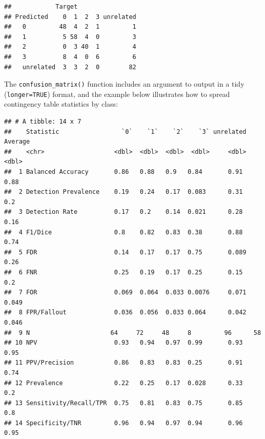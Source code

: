 \documentclass[9pt,a4paper,]{extarticle}
\newenvironment{Shaded}{\begin{snugshade}}{\end{snugshade}}
\newcommand{\DataTypeTok}[1]{\textcolor[rgb]{0.13,0.29,0.53}{#1}}
\newcommand{\DecValTok}[1]{\textcolor[rgb]{0.00,0.00,0.81}{#1}}
\newcommand{\KeywordTok}[1]{\textcolor[rgb]{0.13,0.29,0.53}{\textbf{#1}}}
\newcommand{\NormalTok}[1]{#1}
\newcommand{\OperatorTok}[1]{\textcolor[rgb]{0.81,0.36,0.00}{\textbf{#1}}}
\newcommand{\OtherTok}[1]{\textcolor[rgb]{0.56,0.35,0.01}{#1}}
\newcommand{\StringTok}[1]{\textcolor[rgb]{0.31,0.60,0.02}{#1}}
\begin{document}
\begin{verbatim}
##            Target
## Predicted    0  1  2  3 unrelated
##   0         48  4  2  1         1
##   1          5 58  4  0         3
##   2          0  3 40  1         4
##   3          8  4  0  6         6
##   unrelated  3  3  2  0        82
\end{verbatim}

The \texttt{confusion\_matrix()} function includes an argument to output in a tidy (\texttt{longer=TRUE}) format, and the example below illustrates how to spread contingency table statistics by class:

\begin{Shaded}
\end{Shaded}

\begin{verbatim}
## # A tibble: 14 x 7
##    Statistic                 `0`    `1`    `2`    `3` unrelated Average
##    <chr>                   <dbl>  <dbl>  <dbl>  <dbl>     <dbl>   <dbl>
##  1 Balanced Accuracy       0.86   0.88   0.9   0.84       0.91    0.88 
##  2 Detection Prevalence    0.19   0.24   0.17  0.083      0.31    0.2  
##  3 Detection Rate          0.17   0.2    0.14  0.021      0.28    0.16 
##  4 F1/Dice                 0.8    0.82   0.83  0.38       0.88    0.74 
##  5 FDR                     0.14   0.17   0.17  0.75       0.089   0.26 
##  6 FNR                     0.25   0.19   0.17  0.25       0.15    0.2  
##  7 FOR                     0.069  0.064  0.033 0.0076     0.071   0.049
##  8 FPR/Fallout             0.036  0.056  0.033 0.064      0.042   0.046
##  9 N                      64     72     48     8         96      58    
## 10 NPV                     0.93   0.94   0.97  0.99       0.93    0.95 
## 11 PPV/Precision           0.86   0.83   0.83  0.25       0.91    0.74 
## 12 Prevalence              0.22   0.25   0.17  0.028      0.33    0.2  
## 13 Sensitivity/Recall/TPR  0.75   0.81   0.83  0.75       0.85    0.8  
## 14 Specificity/TNR         0.96   0.94   0.97  0.94       0.96    0.95
\end{verbatim}
\end{document}
